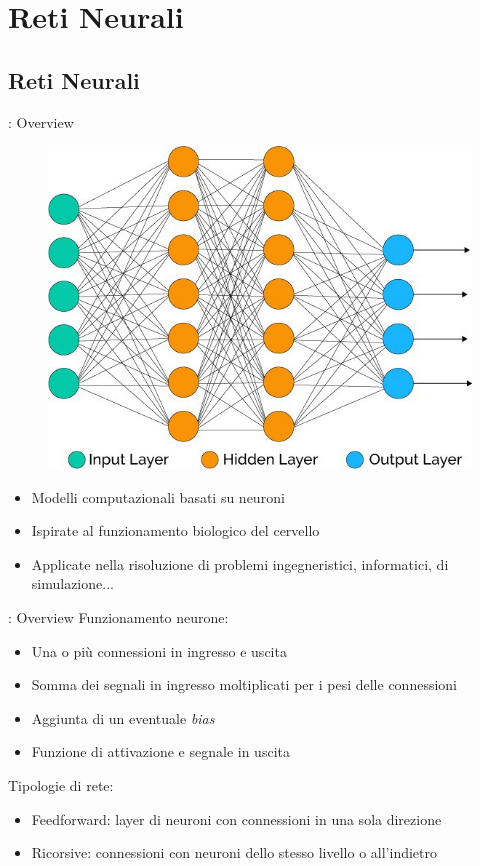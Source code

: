\documentclass[xcolor=x11names,compress, 
					handout %
]{beamer}
\theoremstyle{definition} \newtheorem{esempio}{Esempio}
\theoremstyle{definition}
\begin{document}
	
\section{Reti Neurali}	
	\subsection{Reti Neurali}
		\begin{frame}{\subsecname: Overview}
			\begin{figure}
				\includegraphics[scale=0.3]{immagini/linear}
			\end{figure}
			\begin{itemize}
				\item Modelli computazionali basati su neuroni
				\item Ispirate al funzionamento biologico del cervello
				\item Applicate nella risoluzione di problemi ingegneristici, informatici, di simulazione...
			\end{itemize}
		\end{frame}
		
		\begin{frame}{\subsecname: Overview}
			Funzionamento neurone:
			\begin{itemize}
				\item Una o più connessioni in ingresso e uscita
				\item Somma dei segnali in ingresso moltiplicati per i pesi delle connessioni
				\item Aggiunta di un eventuale \textit{bias}
				\item Funzione di attivazione e segnale in uscita
			\end{itemize}
			
			Tipologie di rete:
			\begin{itemize}
				\item Feedforward: layer di neuroni con connessioni in una sola direzione
				\item Ricorsive: connessioni con neuroni dello stesso livello o all'indietro
			\end{itemize}
		\end{frame}
		
\end{document}
